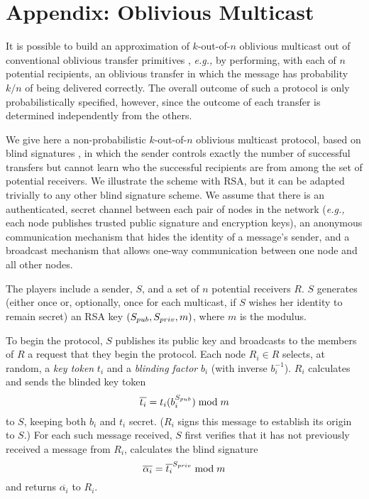 \section*{Appendix: Oblivious Multicast}

It is possible to build an approximation of $k$-out-of-$n$ oblivious
multicast out of conventional oblivious transfer primitives
\cite{obliv}, {\em e.g.,} by performing, with each of $n$ potential
recipients, an oblivious transfer in which the message has probability
$k/n$ of being delivered correctly.  The overall outcome of such a
protocol is only probabilistically specified, however, since the
outcome of each transfer is determined independently from the others.

We give here a non-probabilistic $k$-out-of-$n$ oblivious multicast
protocol, based on blind signatures \cite{blind}, in which the sender
controls exactly the number of successful transfers but cannot learn
who the successful recipients are from among the set of potential
receivers.  We illustrate the scheme with RSA, but it can be adapted
trivially to any other blind signature scheme.  We assume that there
is an authenticated, secret channel between each pair of nodes in the
network ({\em e.g.,} each node publishes trusted public signature and
encryption keys), an anonymous communication mechanism that hides the
identity of a message's sender, and a broadcast mechanism that allows
one-way communication between one node and all other nodes.

The players include a sender, $S$, and a set of $n$ potential
receivers $R$.  $S$ generates (either once or, optionally, once for
each multicast, if $S$ wishes her identity to remain secret) an RSA
key $(S_{\mit pub}, S_{\mit priv}, m)$, where $m$ is the modulus.

To begin the protocol, $S$ publishes its public key and broadcasts to
the members of $R$ a request that they begin the protocol.  Each node
$R_i \in R$ selects, at random, a {\em key token} $t_i$ and a {\em
blinding factor} $b_i$ (with inverse $b_i^{-1}$).  $R_i$ calculates
and sends the blinded key token
\[{\overline{t_i}} = t_i(b_i^{S_{\mit pub}}) \bmod m\]
to $S$, keeping both $b_i$ and $t_i$ secret.  ($R_i$ signs this
message to establish its origin to $S$.)  For each such message
received, $S$ first verifies that it has not previously received a
message from $R_i$, calculates the blind signature
\[\overline{\alpha_i} = {\overline{t_i}}^{S_{\mit priv}} \bmod m\]
and returns $\overline{\alpha_i}$ to $R_i$.

